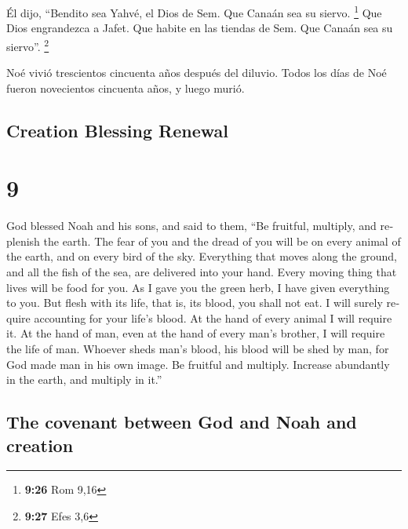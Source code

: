 \begin{paracol}{2}
 Él dijo, ``Bendito sea Yahvé, el Dios de Sem. Que Canaán
sea su siervo. \footnote{\textbf{9:26} Rom 9,16}  Que
Dios engrandezca a Jafet. Que habite en las tiendas de Sem. Que Canaán
sea su siervo''. \footnote{\textbf{9:27} Efes 3,6}

 Noé vivió trescientos cincuenta años después del
diluvio.  Todos los días de Noé fueron novecientos
cincuenta años, y luego murió.

\switchcolumn
\begin{otherlanguage}{english}

\hypertarget{creation-blessing-renewal}{%
\subsection{Creation Blessing Renewal}\label{creation-blessing-renewal}}

\hypertarget{section-17}{%
\section{9}\label{section-17}}

 God blessed Noah and his sons, and said to them, ``Be
fruitful, multiply, and replenish the earth.  The fear of
you and the dread of you will be on every animal of the earth, and on
every bird of the sky. Everything that moves along the ground, and all
the fish of the sea, are delivered into your hand.  Every
moving thing that lives will be food for you. As I gave you the green
herb, I have given everything to you.  But flesh with its
life, that is, its blood, you shall not eat.  I will
surely require accounting for your life's blood. At the hand of every
animal I will require it. At the hand of man, even at the hand of every
man's brother, I will require the life of man.  Whoever
sheds man's blood, his blood will be shed by man, for God made man in
his own image.  Be fruitful and multiply. Increase
abundantly in the earth, and multiply in it.''

\hypertarget{the-covenant-between-god-and-noah-and-creation}{%
\subsection{The covenant between God and Noah and
creation}\label{the-covenant-between-god-and-noah-and-creation}}


\end{otherlanguage}
\end{paracol}
